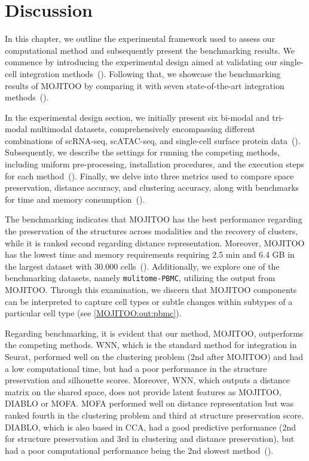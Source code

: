 \section{Discussion}
\label{MOJITOO:discussion}
In this chapter, we outline the experimental framework used to assess our computational method and subsequently present the benchmarking results. We commence by introducing the experimental design aimed at validating our single-cell integration methods~(). Following that, we showcase the benchmarking results of MOJITOO by comparing it with seven state-of-the-art integration methods~().

In the experimental design section, we initially present six bi-modal and tri-modal multimodal datasets, comprehensively encompassing different combinations of scRNA-seq, scATAC-seq, and single-cell surface protein data~(). Subsequently, we describe the settings for running the competing methods, including uniform pre-processing, installation procedures, and the execution steps for each method~(). Finally, we delve into three metrics used to compare space preservation, distance accuracy, and clustering accuracy, along with benchmarks for time and memory consumption~().

The benchmarking indicates that MOJITOO has the best performance regarding the preservation of the structures across modalities and the recovery of clusters, while it is ranked second regarding distance representation. Moreover, MOJITOO has the lowest time and memory requirements requiring 2.5 min and 6.4 GB in the largest dataset with 30.000 cells~(). Additionally, we explore one of the benchmarking datasets, namely \texttt{mulitome-PBMC}, utilizing the output from MOJITOO. Through this examination, we discern that MOJITOO components can be interpreted to capture cell types or subtle changes within subtypes of a particular cell type (see \ref{MOJITOO:out:pbmc}).

Regarding benchmarking, it is evident that our method, MOJITOO, outperforms the competing methods. WNN, which is the standard method for integration in Seurat, performed well on the clustering problem (2nd after MOJITOO) and had a low computational time, but had a poor performance in the structure preservation and silhouette scores. Moreover, WNN, which outputs a distance matrix on the shared space, does not provide latent features as MOJITOO, DIABLO or MOFA. MOFA performed well on distance representation but was ranked fourth in the clustering problem and third at structure preservation score. DIABLO, which is also based in CCA, had a good predictive performance (2nd for structure preservation and 3rd in clustering and distance preservation), but had a poor computational performance being the 2nd slowest method~().


